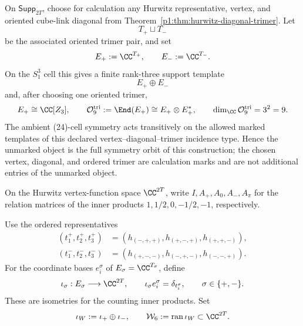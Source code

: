 \documentclass[11pt]{article}
\begin{document}
\begin{definition}
\label{p1:def:s3one-rank-three-support}
On \(\mathsf{Supp}_{2T}\), choose for calculation any Hurwitz representative,
vertex, and oriented cube-link diagonal from
Theorem~\ref{p1:thm:hurwitz-diagonal-trimer}.  Let
\[
    T_+\sqcup T_-
\]
be the associated oriented trimer pair, and set
\[
    E_+:=\CC^{T_+},
    \qquad
    E_-:=\CC^{T_-}.
\]
On the \(S^3_1\) cell this gives a finite rank-three support template
\[
    E_+\oplus E_-
\]
and, after choosing one oriented trimer,
\[
    E_+\cong \CC[Z_3],
    \qquad
    \mathcal O_9^{\rm tri}:=\End(E_+)\cong E_+\otimes E_+^*,
    \qquad
    \dim_\CC\mathcal O_9^{\rm tri}=3^2=9.
\]
The ambient (24)-cell symmetry acts transitively on the allowed marked
templates of this declared vertex--diagonal--trimer incidence type.  Hence the
unmarked object is the full symmetry orbit of this construction; the chosen
vertex, diagonal, and ordered trimer are calculation marks and are not
additional entries of the unmarked object.
\end{definition}

On the Hurwitz vertex-function space \(\CC^{2T}\), write
\(I,A_+,A_0,A_-,A_\pi\) for the relation matrices of the inner products
\(1,1/2,0,-1/2,-1\), respectively.

\begin{definition}
\label{p1:def:s3one-trimer-zero-extension}
Use the ordered representatives
\[
\begin{aligned}
(t_1^+,t_2^+,t_3^+)
&=(h_{(-,+,+)},h_{(+,-,+)},h_{(+,+,-)}),\\
(t_1^-,t_2^-,t_3^-)
&=(h_{(+,-,-)},h_{(-,+,-)},h_{(-,-,+)}).
\end{aligned}
\]
For the coordinate bases \(e_i^\sigma\) of \(E_\sigma=\CC^{T_\sigma}\),
define
\[
 \iota_\sigma:E_\sigma\longrightarrow\CC^{2T},
 \qquad
 \iota_\sigma e_i^\sigma=\delta_{t_i^\sigma},
 \qquad \sigma\in\{+,-\}.
\]
These are isometries for the counting inner products.  Set
\[
 \iota_W:=\iota_+\oplus\iota_-,
 \qquad
 \mathcal W_6:=\operatorname{ran}\iota_W\subset\CC^{2T}.
\]
\end{definition}
\end{document}
